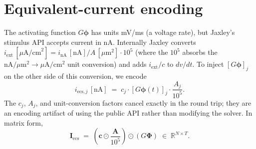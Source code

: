 \section{Equivalent-current encoding}\label{app:equivalent-current}

The activating function $G\boldsymbol{\phi}$ has units mV/ms (a
voltage rate), but Jaxley's stimulus API accepts current in nA.
Internally Jaxley converts
$i_{\text{ext}}\,[\mu\text{A/cm}^2] = i_{\text{nA}}\,[\text{nA}] /
A\,[\mu\text{m}^2]\cdot 10^5$ (where the $10^5$ absorbs the
$\mathrm{nA}/\mu\mathrm{m}^2 \to \mu\mathrm{A}/\mathrm{cm}^2$ unit
conversion) and adds $i_{\text{ext}}/c$ to $dv/dt$. To inject
$[G\boldsymbol{\phi}]_j$ on the other side of this conversion, we
encode
\[
  i_{\text{ecs},j}\,[\text{nA}] \;=\;
    c_j \cdot [G\boldsymbol{\phi}(t)]_j \cdot \frac{A_j}{10^5}.
\]
The $c_j$, $A_j$, and unit-conversion factors cancel exactly in the
round trip; they are an encoding artifact of using the public API
rather than modifying the solver. In matrix form,
\[
  \mathbf{I}_{\text{ecs}} \;=\;
    \left(\mathbf{c} \odot \frac{\mathbf{A}}{10^5}\right)
    \odot (G\boldsymbol{\Phi})
    \;\in\; \mathbb{R}^{N\times T}.
\]

